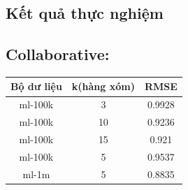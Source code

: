 \documentclass[a0,portrait,11pt]{a0poster}
\begin{document}
\begin{mybox}
\section*{Kết quả thực nghiệm}
\begin{multicols}{3}
\subsection*{Collaborative:}
\begin{center}
\begin{tabular}{|c|c|c|}
\hline
Bộ dư liệu & k(hàng xóm) & RMSE \\ 
\hline
ml-100k & 3 &  0.9928 \\
ml-100k & 10 &  0.9236\\
ml-100k & 15 &  0.921\\
ml-100k & 5 & 0.9537 \\
ml-1m & 5 & 0.8835 \\
\hline
\end{tabular}
\end{center}

\end{multicols}
\end{mybox}
\end{document}
